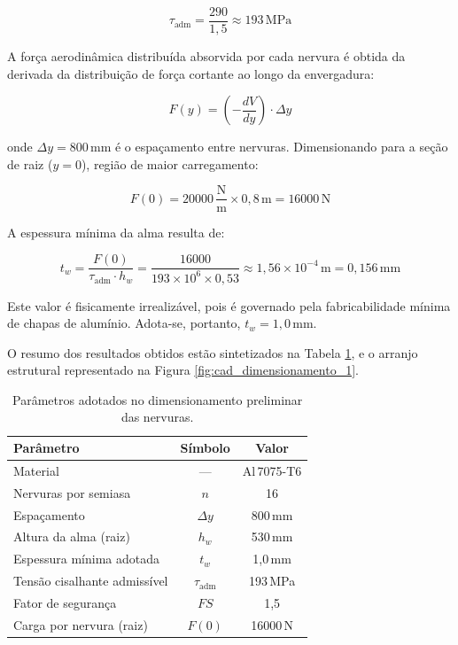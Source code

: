 \begin{equation}
    \tau_\text{adm} = \frac{290}{1{,}5} \approx 193\,\text{MPa}
\end{equation}

A força aerodinâmica distribuída absorvida por cada nervura é obtida da derivada da distribuição de força cortante ao longo da envergadura:

\begin{equation}
    F(y) = \left(-\frac{dV}{dy}\right) \cdot \Delta y
    \label{eq:carga_nervura}
\end{equation}

\noindent onde $\Delta y = 800$\,mm é o espaçamento entre nervuras. Dimensionando para a seção de raiz ($y = 0$), região de maior carregamento:

\begin{equation}
    F(0) = 20000\,\frac{\text{N}}{\text{m}} \times 0{,}8\,\text{m}
         = 16000\,\text{N}
\end{equation}

A espessura mínima da alma resulta de:

\begin{equation}
    t_w = \frac{F(0)}{\tau_\text{adm} \cdot h_w}
        = \frac{16000}{193 \times 10^6 \times 0{,}53}
        \approx 1{,}56 \times 10^{-4}\,\text{m}
        = 0{,}156\,\text{mm}
    \label{eq:espessura_minima}
\end{equation}

\noindent Este valor é fisicamente irrealizável, pois é governado pela fabricabilidade mínima de chapas de alumínio. Adota-se, portanto, $t_w = 1{,}0$\,mm.

O resumo dos resultados obtidos estão sintetizados na Tabela \ref{tab:nervuras}, e o arranjo estrutural representado na Figura \ref{fig:cad_dimensionamento_1}.

\begin{table}[H]
\centering
\caption{Parâmetros adotados no dimensionamento preliminar das nervuras.}
\label{tab:nervuras}
\begin{tabular}{lcc}
\toprule
\textbf{Parâmetro} & \textbf{Símbolo} & \textbf{Valor} \\
\midrule
Material                          & ---              & Al\,7075-T6      \\
Nervuras por semiasa              & $n$              & 16               \\
Espaçamento                       & $\Delta y$       & 800\,mm          \\
Altura da alma (raiz)             & $h_w$            & 530\,mm          \\
Espessura mínima adotada          & $t_w$            & 1{,}0\,mm        \\
Tensão cisalhante admissível      & $\tau_\text{adm}$& 193\,MPa         \\
Fator de segurança                & $FS$             & 1{,}5            \\
Carga por nervura (raiz)          & $F(0)$           & 16000\,N      \\
\bottomrule
\end{tabular}
\end{table}

